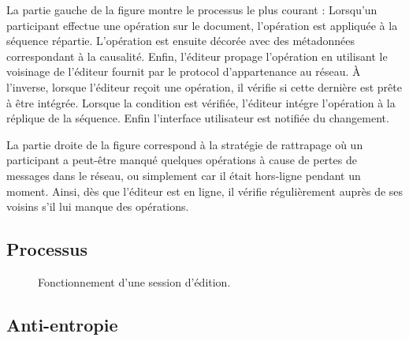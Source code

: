 La partie gauche de la figure montre le processus le plus courant : Lorsqu'un
participant effectue une opération sur le document, l'opération est appliquée à
la séquence répartie. L'opération est ensuite décorée avec des métadonnées
correspondant à la causalité. Enfin, l'éditeur propage l'opération en utilisant
le voisinage de l'éditeur fournit par le protocol d'appartenance au réseau.  À
l'inverse, lorsque l'éditeur reçoit une opération, il vérifie si cette dernière
est prête à être intégrée. Lorsque la condition est vérifiée, l'éditeur intégre
l'opération à la réplique de la séquence. Enfin l'interface utilisateur est
notifiée du changement.

La partie droite de la figure correspond à la stratégie de rattrapage où un
participant a peut-être manqué quelques opérations à cause de pertes de messages
dans le réseau, ou simplement car il était hors-ligne pendant un moment. Ainsi,
dès que l'éditeur est en ligne, il vérifie régulièrement auprès de ses voisins
s'il lui manque des opérations.

\subsection{Processus}

\begin{figure}
  \begin{center}
    
    \caption{\label{editor:fig:processus}Fonctionnement d'une session d'édition.}
  \end{center}
\end{figure}

\subsection{Anti-entropie}

